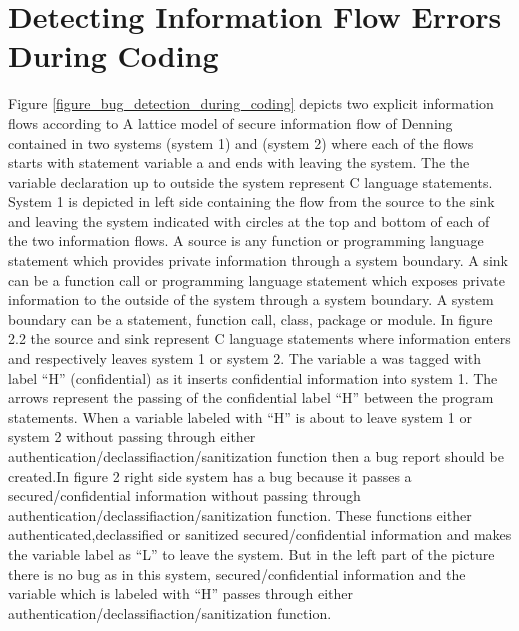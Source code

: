 \section{ Detecting Information Flow Errors During Coding}

Figure \ref{figure_bug_detection_during_coding} depicts two explicit information flows according to A lattice model of secure information flow of Denning \cite{ref_14_denning1976lattice} contained in two systems (system 1) and (system 2)
where each of the flows starts with statement variable a and ends with leaving the system. The the variable declaration up to outside the system represent C language statements. System 1 is depicted in left side containing the flow from the source to the sink and leaving the system indicated with circles at the top and bottom of each of the
two information flows. A source is any function or programming language statement which provides private information through a system boundary. A sink can be a function call or programming language statement which exposes private information to the outside of the system through a system boundary. A system boundary can be a statement, function call, class, package or module. In figure 2.2 the source and sink represent C language statements where information enters and respectively leaves system 1 or system 2. The variable a was tagged with label \enquote{H} (confidential) as it inserts confidential information into system 1. The arrows represent the passing of the confidential label \enquote{H} between the program statements. When a variable labeled with \enquote{H} is about to leave system 1 or system 2 without passing through either authentication/declassifiaction/sanitization function then a bug report should be created.In figure 2 right side system has a bug because it passes a secured/confidential information without passing through authentication/declassifiaction/sanitization function. These functions either authenticated,declassified or sanitized  secured/confidential information and makes the variable label as \enquote{L} to leave the system. But in the left part of the picture there is no bug as in this system, secured/confidential information and the variable which is labeled with \enquote{H} passes through either authentication/declassifiaction/sanitization function.


